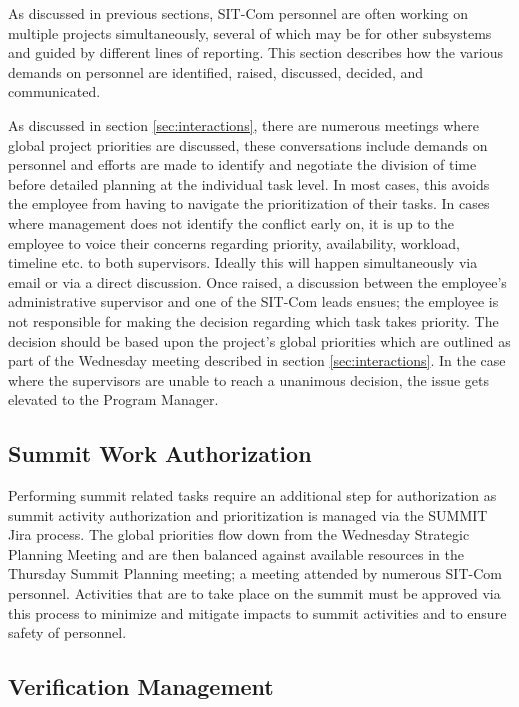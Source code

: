 \documentclass[SE,lsstdraft,authoryear,toc]{lsstdoc}
\begin{document}
As discussed in previous sections, SIT-Com personnel are often working on multiple projects simultaneously, several of which may be for other subsystems and guided by different lines of reporting.
This section describes how the various demands on personnel are identified, raised, discussed, decided, and communicated.

As discussed in section \ref{sec:interactions}, there are numerous meetings where global project priorities are discussed, these conversations include demands on personnel and efforts are made to identify and negotiate the division of time before detailed planning at the individual task level.
In most cases, this avoids the employee from having to navigate the prioritization of their tasks.
In cases where management does not identify the conflict early on, it is up to the employee to voice their concerns regarding priority, availability, workload, timeline etc. to both supervisors.
Ideally this will happen simultaneously via email or via a direct discussion.
Once raised, a discussion between the employee's administrative supervisor and one of the SIT-Com leads ensues; the employee is not responsible for making the decision regarding which task takes priority.
The decision should be based upon the project's global priorities which are outlined as part of the Wednesday meeting described in section \ref{sec:interactions}.
In the case where the supervisors are unable to reach a unanimous decision, the issue gets elevated to the Program Manager.

\subsection{Summit Work Authorization}
Performing summit related tasks require an additional step for authorization as summit activity authorization and prioritization is managed via the SUMMIT Jira process.
The global priorities flow down from the Wednesday Strategic Planning Meeting and are then balanced against available resources in the Thursday Summit Planning meeting; a meeting attended by numerous SIT-Com personnel.
Activities that are to take place on the summit must be approved via this process to minimize and mitigate impacts to summit activities and to ensure safety of personnel.

\subsection{Verification Management}
\end{document}

